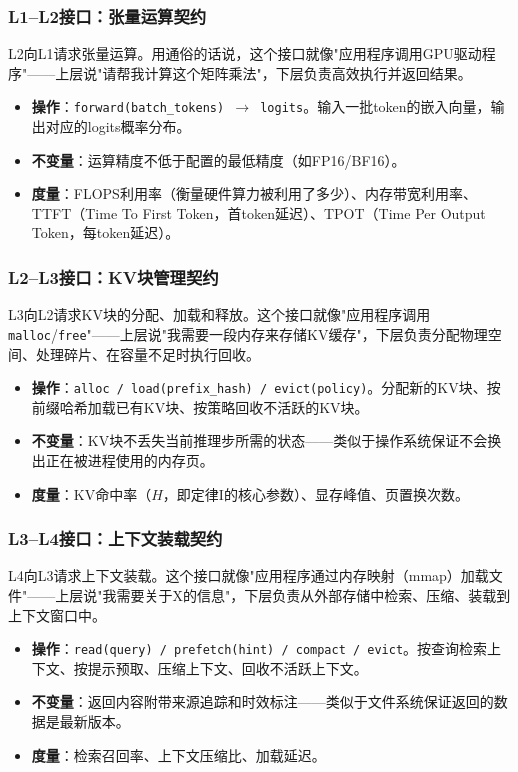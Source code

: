 \subsubsection{L1--L2接口：张量运算契约}

L2向L1请求张量运算。用通俗的话说，这个接口就像"应用程序调用GPU驱动程序"——上层说"请帮我计算这个矩阵乘法"，下层负责高效执行并返回结果。

\begin{itemize}[nosep]
\item \textbf{操作}：\texttt{forward(batch\_tokens) $\to$ logits}。输入一批token的嵌入向量，输出对应的logits概率分布。
\item \textbf{不变量}：运算精度不低于配置的最低精度（如FP16/BF16）。
\item \textbf{度量}：FLOPS利用率（衡量硬件算力被利用了多少）、内存带宽利用率、TTFT（Time To First Token，首token延迟）、TPOT（Time Per Output Token，每token延迟）。
\end{itemize}

\subsubsection{L2--L3接口：KV块管理契约}

L3向L2请求KV块的分配、加载和释放。这个接口就像"应用程序调用\texttt{malloc}/\texttt{free}"——上层说"我需要一段内存来存储KV缓存"，下层负责分配物理空间、处理碎片、在容量不足时执行回收。

\begin{itemize}[nosep]
\item \textbf{操作}：\texttt{alloc / load(prefix\_hash) / evict(policy)}。分配新的KV块、按前缀哈希加载已有KV块、按策略回收不活跃的KV块。
\item \textbf{不变量}：KV块不丢失当前推理步所需的状态——类似于操作系统保证不会换出正在被进程使用的内存页。
\item \textbf{度量}：KV命中率（$H$，即定律I的核心参数）、显存峰值、页置换次数。
\end{itemize}

\subsubsection{L3--L4接口：上下文装载契约}

L4向L3请求上下文装载。这个接口就像"应用程序通过内存映射（mmap）加载文件"——上层说"我需要关于X的信息"，下层负责从外部存储中检索、压缩、装载到上下文窗口中。

\begin{itemize}[nosep]
\item \textbf{操作}：\texttt{read(query) / prefetch(hint) / compact / evict}。按查询检索上下文、按提示预取、压缩上下文、回收不活跃上下文。
\item \textbf{不变量}：返回内容附带来源追踪和时效标注——类似于文件系统保证返回的数据是最新版本。
\item \textbf{度量}：检索召回率、上下文压缩比、加载延迟。
\end{itemize}


